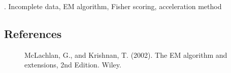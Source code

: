 \documentclass[12pt]{article}
\begin{document}
\vskip 2mm

. Incomplete data, EM algorithm, Fisher scoring, acceleration method



%        
%
%        

\subsection*{References}


\begin{description}

\iffalse
\item
Barnett, J.A., Payne, R.W. and Yarrow, D. (1990).
\textit{Yeasts: Characteristics and identification: Second Edition.}
Cambridge: Cambridge University Press.
\fi

\item[] McLachlan, G., and Krishnan, T. (2002). The EM algorithm and
	   extensions, 2nd Edition. Wiley.

		   
		   \iffalse
\item
(ed.) Barnett, V., Payne, R. and Steiner, R. (1995).
\textit{Agricultural Sustainability: Economic, Environmental and
Statistical Considerations}. Chichester: Wiley.

\item
Payne, R.W. (1997).
\textit{Algorithm AS314 Inversion of matrices Statistics},
\textbf{46}, 295--298.

\item
Payne, R.W. and Welham, S.J. (1990).
A comparison of algorithms for combination of information in generally
balanced designs.
In: \textit{COMPSTAT90 Proceedings in Computational Statistics}, 297--302.
Heidelberg: Physica-Verlag.
\fi
\end{description}
\end{document}
